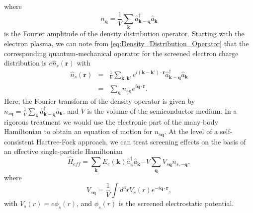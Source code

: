 where \begin{equation}
n_{\mathbf{q}}=\frac{1}{V}\sum_{\mathbf{k}}\hat{a}_{\mathbf{k}-\mathbf{q}}^{\dagger}\hat{a}_{\mathbf{k}}\end{equation}
is the Fourier amplitude of the density distribution operator. Starting
with the electron plasma, we can note from \ref{eq:Density_Distribution_Operator}
that the corresponding quantum-mechanical operator for the screened
electron charge distribution is $e\hat{n}_{s}(\mathbf{r})$ with\begin{eqnarray}
\hat{n}_{s}(\mathbf{r}) & = & \frac{1}{V}\sum_{\mathbf{k},\mathbf{k}'}e^{i\left(\mathbf{k}-\mathbf{k}'\right)\cdot\mathbf{r}}\hat{a}_{\mathbf{k}-\mathbf{q}}^{\dagger}\hat{a}_{\mathbf{k}}\\
 & = & \sum_{\mathbf{q}}n_{s\mathbf{q}}e^{i\mathbf{q}\cdot\mathbf{r}}.\end{eqnarray}
Here, the Fourier transform of the density operator is given by $n_{s\mathbf{q}}=\frac{1}{V}\sum_{\mathbf{k}}\hat{a}_{\mathbf{k}-\mathbf{q}}^{\dagger}\hat{a}_{\mathbf{k}}$,
and $V$ is the volume of the semiconductor medium. In a rigorous
treatment we would use the electronic part of the many-body Hamiltonian
to obtain an equation of motion for $n_{s\mathbf{q}}$. At the level
of a self-consistent Hartree-Fock approach, we can treat screening
effects on the basis of an effective single-particle Hamiltonian \begin{equation}
\hat{H}_{eff}=\sum_{\mathbf{k}}E_{e}(\mathbf{k})\hat{a}_{\mathbf{k}}^{\dagger}\hat{a}_{\mathbf{k}}\mathbf{-}V\sum_{\mathbf{q}}V_{s\mathbf{q}}n_{s,-\mathbf{q}},\label{eq:Effective_Single_Particle_Hamiltonian}\end{equation}
where \begin{equation}
V_{s\mathbf{q}}=\frac{1}{V}\int d^{3}rV_{s}(r)e^{-i\mathbf{q}\cdot\mathbf{r}},\end{equation}
with $V_{s}(r)=e\phi_{s}(r)$, and $\phi_{s}(r)$ is the screened
electrostatic potential.

